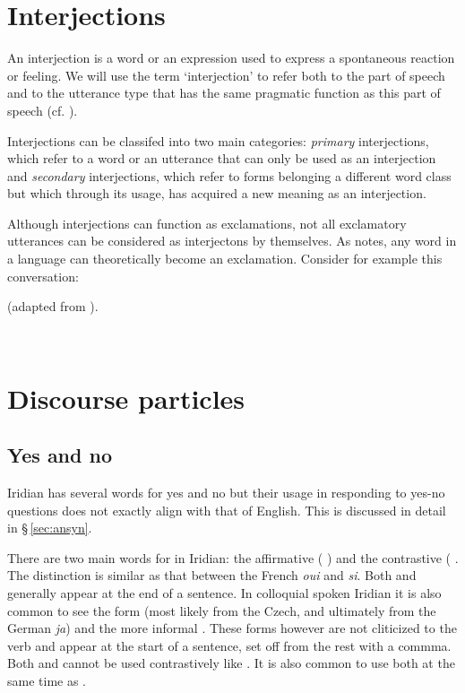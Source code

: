 \section{Interjections}

An interjection is a word or an expression used to express a spontaneous reaction or feeling. We will use the term `interjection' to refer both to the part of speech and to the utterance type that has the same pragmatic function as this part of speech (cf. \cite{ameka1992}).

Interjections can be classifed into two main categories: \emph{primary} interjections, which refer to a word or an utterance that can only be used as an interjection and \emph{secondary} interjections, which refer to forms belonging a different word class but which through its usage, has acquired a new meaning as an interjection.

Although interjections can function as exclamations, not all exclamatory utterances can be considered as interjectons by themselves. As \textcite{jovanovic2004} notes, any word in a language can theoretically become an exclamation. Consider for example this conversation:

\ex (adapted from \cite{jovanovic2004}).\\

  \medskip

  \\
\xe


\section{Discourse particles}

\subsection{Yes and no}
Iridian has several words for yes and no but their usage in responding to yes-no questions does not exactly align with that of English. This is discussed in detail in \S\,\ref{sec:ansyn}.

There are two main words for  in Iridian: the affirmative  ( ) and the contrastive  ( . The distinction is similar as that between the French \emph{oui} and \emph{si}. Both  and  generally appear at the end of a sentence. In colloquial spoken Iridian it is also common to see the form  (most likely from the Czech, and ultimately from the German \emph{ja}) and the more informal . These forms however are not cliticized to the verb and appear at the start of a sentence, set off from the rest with a commma. Both  and  cannot be used contrastively like . It is also common to use both  at the same time as .

